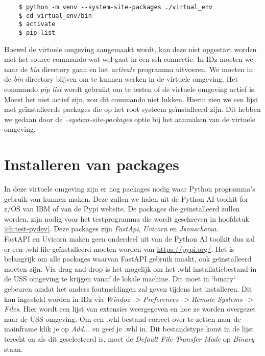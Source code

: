 \begin{lstlisting}
    $ python -m venv --system-site-packages ./virtual_env
    $ cd virtual_env/bin
    $ activate
    $ pip list
\end{lstlisting}

Hoewel de virtuele omgeving aangemaakt wordt, kan deze niet opgestart worden met het source commando wat wel gaat in een ssh connectie. In IDz moeten we naar de \textit{bin} directory gaan en het \textit{activate} programma uitvoeren. We moeten in de \textit{bin} directory blijven om te kunnen werken in de virtuele omgeving.
Het commando \textit{pip list} wordt gebruikt om te testen of de virtuele omgeving actief is. Moest het niet actief zijn, zou dit commando niet lukken. Hierin zien we een lijst met geïnstalleerde packages die op het root systeem geïnstalleerd zijn. Dit hebben we gedaan door de \textit{--system-site-packages} optie bij het aanmaken van de virtuele omgeving.

\section{Installeren van packages}
In deze virtuele omgeving zijn er nog packages nodig waar Python programma's gebruik van kunnen maken. Deze zullen we halen uit de Python AI toolkit for z/OS van IBM of van de Pypi website. De packages die geïnstalleerd zullen worden, zijn nodig voor het testprogramma die wordt geschreven in hoofdstuk \ref{ch:test-pydev}. Deze packages zijn \textit{FastApi}, \textit{Uvicorn} en \textit{Jsonschema}. \\

FastAPI en Uvicorn maken geen onderdeel uit van de Python AI toolkit dus zal er een .whl file geïnstalleerd moeten worden van \url{https://pypi.org/}. Het is belangrijk om alle packages waarvan FastAPI gebruik maakt, ook geïnstalleerd moeten zijn. Via drag and drop is het mogelijk om het .whl installatiebestand in de USS omgeving te krijgen vanaf de lokale machine. Dit moet in `binary` gebeuren omdat het anders foutmeldingen zal geven tijdens het installeren. Dit kan ingesteld worden in IDz via \textit{Windoz -> Preferences -> Remote Systems -> Files}. Hier wordt een lijst van extensies weergegeven en hoe ze worden overgezet naar de USS omgeving. Om een .whl bestand correct over te zetten naar de mainframe klik je op \textit{Add...} en geef je .whl in. Dit bestandstype komt in de lijst terecht en als dit geselecteerd is, moet de \textit{Default File Transfer Mode} op \textit{Binary} staan. \\

